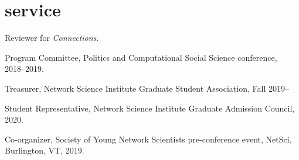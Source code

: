\documentclass[11pt, letter]{article}
\begin{document}
 \section{service}
 Reviewer for \textit{Connections}.

 Program Committee, Politics and Computational Social Science conference,
 2018--2019.

 Treasurer, Network Science Institute Graduate Student Association, Fall 2019--

 Student Representative, Network Science Institute Graduate Admission Council,
 2020.

 Co-organizer, Society of Young Network Scientists pre-conference event, NetSci,
 Burlington, VT, 2019.
\end{document}
